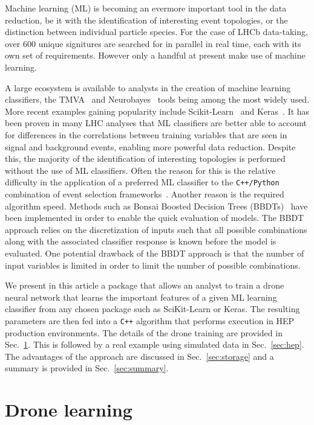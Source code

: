 \documentclass[final,5p,times,twocolumn]{elsarticle}
\def\lhcb {\mbox{LHCb}\xspace}
\begin{document}
Machine learning (ML) is becoming an evermore important tool in the data reduction,
be it with the identification of interesting event topologies, or the distinction
between individual particle species. For the case of \lhcb data-taking, over 600
unique signitures are searched for in parallel in real time, each with its own set of requirements.
However only a handful at present make use of machine learning.

A large ecosystem is available to analysts in the creation of machine learning classifiers,
the TMVA~\cite{Hocker:2007ht} and Neurobayes~\cite{Feindt:2006pm} tools being among the most widely used.
More recent examples gaining popularity include Scikit-Learn~\cite{Pedregosa:2012toh}
and Keras~\cite{keras}. It has been proven in many LHC analyses that
ML classifiers are better able to account for differences in the correlations between
training variables that are seen in signal and background events, enabling more
powerful data reduction.
Despite this, the majority of the identification of interesting topologies is performed
without the use of ML classifiers. Often the reason for this is the relative difficulty in
the application of a preferred ML classifier to the {\tt C++/Python} combination
of event selection frameworks~\cite{Barrand:2001ny}. Another 
reason is the required algorithm speed. Methods such as Bonsai
Boosted Decision Trees (BBDTs)~\cite{Gligorov:2012qt} have been implemented in order
to enable the quick evaluation of models. The BBDT approach relies on the 
discretization of inputs such that all possible combinations along with
the associated classifier response is known before the model is evaluated.
One potential drawback of the BBDT approach is that the number of input variables is limited
in order to limit the number of possible combinations. 

We present in this article a package that allows an analyst to 
train a drone neural network that learns the important features of a 
given ML learning classifier from any chosen package such as SciKit-Learn or Keras.
The resulting parameters are then fed into a {\tt C++} algorithm that
performs execution in HEP production environments. The details of the
drone training are provided in Sec.~\ref{sec:dlearn}. This is followed
by a real example using simulated data in Sec.~\ref{sec:hep}. The advantages
of the approach are discussed in Sec.~\ref{sec:storage} and a summary is 
provided in Sec.~\ref{sec:summary}.


\section{Drone learning}
\label{sec:dlearn}
\end{document}
